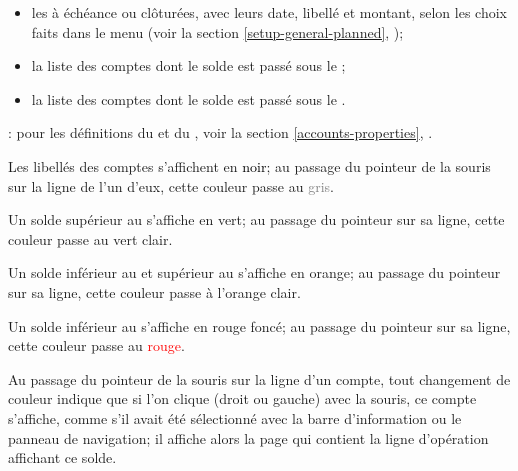 \begin{itemize}
\begin{itemize}
\begin{itemize}
					\item le solde des comptes de passif et leur solde final,
					\item le solde des comptes d'actif et leur solde final;
				\end{itemize}
			\item les  à échéance ou clôturées, avec leurs date, libellé et montant, selon les choix faits dans le menu  (voir la section \vref{setup-general-planned}, );
			\item la liste des comptes dont le solde est passé sous le ;
			\item la liste des comptes dont le solde est passé sous le .
	\end{itemize}
\end{itemize}


\Note{}: pour les définitions du  et du , voir la section \vref{accounts-properties}, .


Les libellés des comptes s'affichent en \textcolor{black}{noir}; au passage du pointeur de la souris sur la ligne de l'un d'eux, cette couleur passe au \textcolor{gray}{gris}.

Un solde supérieur au  s'affiche en \textcolor[RGB]{0,126,0}{vert}; au passage du pointeur sur sa ligne, cette couleur passe au \textcolor[RGB]{0,227,0}{vert clair}.

Un solde inférieur au  et supérieur au  s'affiche en \textcolor[RGB]{230,155,0}{orange}; au passage du pointeur sur sa ligne, cette couleur passe à l'\textcolor[RGB]{255,200,0}{orange clair}.

Un solde inférieur au  s'affiche en \textcolor[RGB]{153,0,0}{rouge foncé}; au passage du pointeur sur sa ligne, cette couleur passe au \textcolor{red}{rouge}.

Au passage du pointeur de la souris sur la ligne d'un compte, tout changement de couleur indique que si l'on clique (droit ou gauche) avec la souris, ce compte s'affiche, comme s'il avait été sélectionné avec la barre d'information ou le panneau de navigation; il affiche alors la page qui contient la ligne d'opération affichant ce solde.

